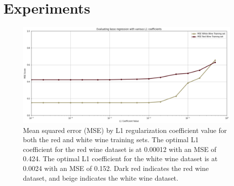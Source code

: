 
\section{Experiments}
\label{sec:expts}

\begin{figure}[htb]

  \centering  %

  \includegraphics[width=\linewidth]{figs/hptuning.png}

  \caption{Mean squared error (MSE) by L1 regularization coefficient value for both the red and white wine training sets. The optimal L1 coefficient for the red wine dataset is at 0.00012 with an MSE of 0.424. The optimal L1 coefficient for the white wine dataset is at 0.0024 with an MSE of 0.152. Dark red indicates the red wine dataset, and beige indicates the white wine dataset.}

  \label{fig:hptuning}

\end{figure}

